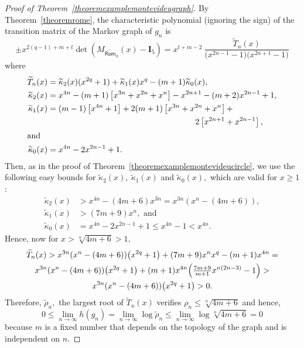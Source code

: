 \documentclass[a4paper, 11pt]{amsart}
\numberwithin{equation}{section}
\theoremstyle{customnumberedtheorem}
\theoremstyle{definitionwithbfnote}
\begin{document}
\begin{proof}[Proof of Theorem~\ref{theoremexamplemontevideugraph}]
By Theorem~\ref{theoremrome}, the characteristic polynomial
(ignoring the sign) of the transition matrix of the Markov  graph of
$g_n$ is
\[
  \pm x^{2(q-1)+m+t}\det(M_{\widetilde{\textsf{Rom}}_n}(x) - \mathbf{I}_{5}) =
   x^{t+m-2}\ \frac{\widetilde{T}_n(x)}{\bigl(x^{2n-1}-1\bigr)\bigl(x^{2n+1}-1\bigl)}
\]
where
\begin{align*}
   \widetilde{T}_n(x) &= \widetilde{\kappa}_2(x) (x^{2q} + 1) +  \widetilde{\kappa}_1(x) x^{q}  - (m+1)\widetilde{\kappa}_0(x),\\
   \widetilde{\kappa}_2(x) &= x^{4n} - (m+1)\left[ x^{3n} + x^{2n} + x^{n}\right] - x^{2n+1} - (m+2)x^{2n-1} + 1,\\
   \widetilde{\kappa}_1(x) &= (m-1)\left[x^{4n} + 1\right] + 2(m+1)\left[x^{3n} + x^{2n} + x^{n}\right] +\\
                           &\hspace*{18em}2\left[x^{2n+1} + x^{2n-1}\right],\\
\intertext{and}
   \widetilde{\kappa}_0(x) &= x^{4n} -2x^{2n-1} + 1.
\end{align*}
Then, as in the proof of Theorem~\ref{theoremexamplemontevideucircle},
we use the following easy bounds for
$\widetilde{\kappa}_2(x),\ \widetilde{\kappa}_1(x)$ and
$\widetilde{\kappa}_0(x),$ which are valid for $x \ge 1$:
\begin{align*}
 \widetilde{\kappa}_2(x) &> x^{4n} - (4m+6)x^{3n} = x^{3n} (x^n - (4m+6)),\\
 \widetilde{\kappa}_1(x) &> (7m+9)x^{n},\text{ and}\\
 \widetilde{\kappa}_0(x) &= x^{4n} - 2x^{2n-1} + 1 \le x^{4n} - 1 < x^{4n}.
\end{align*}
Hence, now for $x > \sqrt[n]{4m+6} > 1,$
\begin{multline*}
 \widetilde{T}_n(x) > x^{3n} (x^n - (4m+6))\bigl(x^{2q} + 1\bigr) + (7m+9)x^{n}x^{q} - (m+1)x^{4n} = \\
          x^{3n} (x^n - (4m+6))\bigl(x^{2q} + 1\bigr) + (m+1)x^{4n} \Bigl(\tfrac{7m+9}{m+1}x^{n(2n-3)} - 1\Bigr) > \\
          x^{3n} (x^n - (4m+6))\bigl(x^{2q} + 1\bigr) > 0.
\end{multline*}
Therefore, $\tilde{\rho}_n,$ the largest root of $\widetilde{T}_n(x)$
verifies $\rho_n \le \sqrt[n]{4m+6}$ and hence,
\[ 0 \le \lim_{n\to\infty} h(g_n) = \lim_{n\to\infty} \log \tilde{\rho}_n \le \lim_{n\to\infty} \log \sqrt[n]{4m+6} = 0 \]
because $m$ is a fixed number that depends on the topology of the graph and is independent on $n.$
\end{proof}
\end{document}

